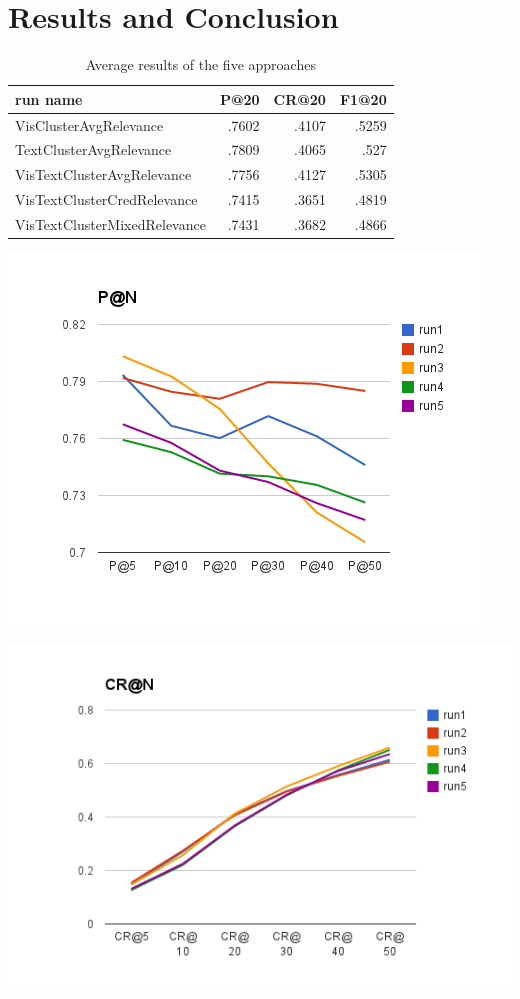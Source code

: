 \documentclass{acm_proc_article-me}
\begin{document}
\section{Results and Conclusion}

\begin{table}[h]
\begin{tabular}{|l|r|r|r|}
	\hline 
	run name & P@20 & CR@20 & F1@20\tabularnewline
	\hline 
	\hline 
	VisClusterAvgRelevance & .7602 & .4107 & .5259\tabularnewline
	\hline 
	TextClusterAvgRelevance & .7809 & .4065 & .527\tabularnewline
	\hline 
	VisTextClusterAvgRelevance & .7756 & .4127 & .5305\tabularnewline
	\hline 
	VisTextClusterCredRelevance & .7415 & .3651 & .4819\tabularnewline
	\hline 
	VisTextClusterMixedRelevance & .7431 & .3682 & .4866\tabularnewline
	\hline 
\end{tabular}
\caption{Average results of the five approaches}
\end{table}

\includegraphics[width=0.9\linewidth]{p}


\includegraphics[width=0.9\linewidth]{cr}
\end{document}
